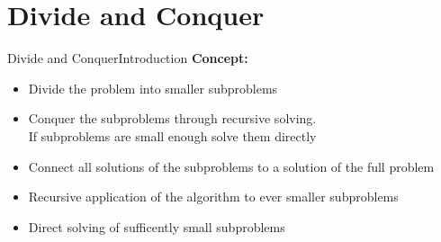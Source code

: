 \section{Divide and Conquer}
\label{chap:divide_and_conquer}


\begin{frame}{Divide and Conquer}{Introduction}
  \textbf{Concept:}
  \begin{itemize}
    \item<2->
      {\color{Mittel-Blau}Divide} the problem into smaller subproblems
    \item<3->
      {\color{Mittel-Blau}Conquer} the subproblems through recursive solving.\\
      If subproblems are small enough solve them directly
    \item<4->
      {\color{Mittel-Blau}Connect} all solutions of the subproblems to a solution of the
      full problem
    \item<5->
      {\color{Mittel-Blau}Recursive} application of the algorithm to ever smaller
      subproblems
    \item<6->
      {\color{Mittel-Blau}Direct} solving of sufficently small subproblems
  \end{itemize}
\end{frame}





